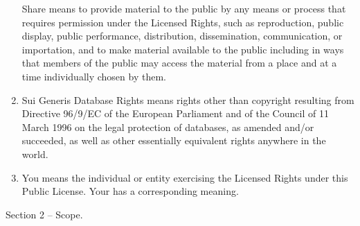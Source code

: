 \documentclass[]{article}
\begin{document}
\begin{enumerate}
  Share means to provide material to the public by any means or process
  that requires permission under the Licensed Rights, such as
  reproduction, public display, public performance, distribution,
  dissemination, communication, or importation, and to make material
  available to the public including in ways that members of the public
  may access the material from a place and at a time individually chosen
  by them.
\item
  Sui Generis Database Rights means rights other than copyright
  resulting from Directive 96/9/EC of the European Parliament and of the
  Council of 11 March 1996 on the legal protection of databases, as
  amended and/or succeeded, as well as other essentially equivalent
  rights anywhere in the world.
\item
  You means the individual or entity exercising the Licensed Rights
  under this Public License. Your has a corresponding meaning.
\end{enumerate}

Section 2 -- Scope.
\end{document}
